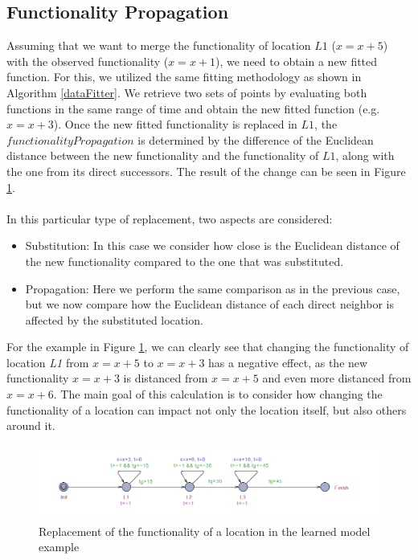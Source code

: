 \subsection{Functionality Propagation}
Assuming that we want to merge the functionality of location $L1$ ($x=x+5$) with the observed functionality ($x=x+1$), we need to obtain a new fitted function. For this, we utilized the same fitting methodology as shown in Algorithm \ref{dataFitter}. We retrieve two sets of points by evaluating both functions in the same range of time and obtain the new fitted function (e.g. $x=x+3$). Once the new fitted functionality is replaced in $L1$, the $functionalityPropagation$ is determined by the difference of the Euclidean distance between the new functionality and the functionality of $L1$, along with the one from its direct successors. The result of the change  can be seen in Figure \ref{learned_model_example_time_replacement_functionality}. \\ \\
%
In this particular type of replacement, two aspects are considered:
\begin{itemize}
	\item Substitution: In this case we consider how close is the Euclidean distance of the new functionality compared to the one that was substituted. 
	\item Propagation: Here we perform the same comparison as in the previous case, but we now compare how the Euclidean distance of each direct neighbor is affected by the substituted location.
\end{itemize}
%
For the example in Figure \ref{learned_model_example_time_replacement_functionality}, we can clearly see that changing the functionality of location \textit{L1} from $x=x+5$ to $x=x+3$ has a negative effect, as the new functionality $x=x+3$ is distanced from $x=x+5$ and even more distanced from $x=x+6$. The main goal of this calculation is to consider how changing the functionality of a location can impact not only the location itself, but also others around it. 
\begin{figure}[h]
	\centering
	\includegraphics[scale=0.5]{./pictures/learned_model_example_replacement_functionality.png}
	\caption{Replacement of the functionality of a location in the learned model example}
	\label{learned_model_example_time_replacement_functionality}
\end{figure}








